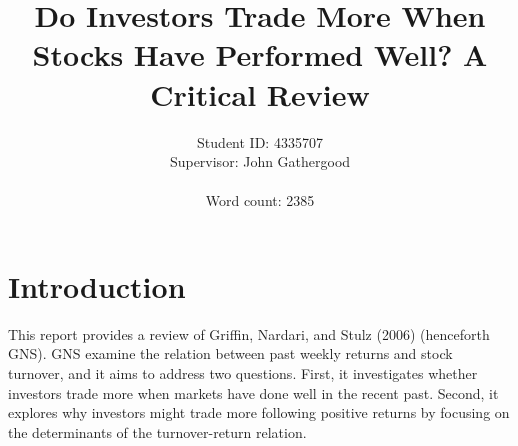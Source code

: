 \documentclass[final,3p,times,twocolumn]{elsarticle}
\begin{document}
\begin{frontmatter}


\title{\huge{Do Investors Trade More When Stocks Have
Performed Well? A Critical Review}}




\author{\Large{Student ID: 4335707 \\
Supervisor: John Gathergood \\ \\
Word count: 2385}}



%

\end{frontmatter}



\section{Introduction}
\label{S:1}

This report provides a review of Griffin, Nardari, and Stulz (2006) (henceforth GNS). GNS examine the relation between past weekly returns and stock turnover, and it aims to address two questions. First, it investigates whether investors trade more when markets have done well in the recent past. Second, it explores why investors might trade more following positive returns by focusing on the determinants of the turnover-return relation.\par
\end{document}
